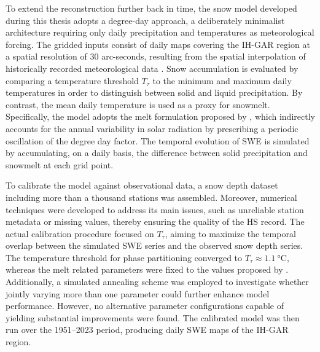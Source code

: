 \documentclass[12pt, a4paper]{article}
\begin{document}
To extend the reconstruction further back in time, the snow model developed during this thesis adopts a degree-day approach, a deliberately minimalist 
architecture requiring only daily precipitation and temperatures as meteorological forcing. The gridded inputs consist of daily maps covering the 
IH-GAR region at a spatial resolution of \num{30} arc-seconds, resulting from the spatial interpolation of historically recorded meteorological data 
\parencite{precipitation_IHGAR}. Snow accumulation is evaluated by comparing a temperature threshold $T_\tau$ to the minimum and maximum daily 
temperatures in order to distinguish between solid and liquid precipitation. By contrast, the mean daily temperature is used as a proxy for snowmelt. 
Specifically, the model adopts the melt formulation proposed by \textcite{Magnusson_DDF}, which indirectly accounts for the annual variability in solar 
radiation by prescribing a periodic oscillation of the degree day factor. The temporal evolution of SWE is simulated by accumulating, on a daily 
basis, the difference between solid precipitation and snowmelt at each grid point. 

To calibrate the model against observational data, a snow depth dataset including more than a thousand stations was assembled. Moreover, numerical 
techniques were developed to address its main issues, such as unreliable station metadata or missing values, thereby ensuring the quality of the HS 
record. The actual calibration procedure focused on $T_\tau$, aiming to maximize the temporal overlap between the simulated SWE series and the 
observed snow depth series. The temperature threshold for phase partitioning converged to $T_\tau \approx \SI{1.1}{\degreeCelsius}$, whereas the melt 
related parameters were fixed to the values proposed by \textcite{Magnusson_DDF}. Additionally, a simulated annealing scheme was employed to investigate 
whether jointly varying more than one parameter could further enhance model performance. However, no alternative parameter configurations capable of 
yielding substantial improvements were found. The calibrated model was then run over the 1951--2023 period, producing daily SWE maps of the IH-GAR 
region. 
\end{document}

